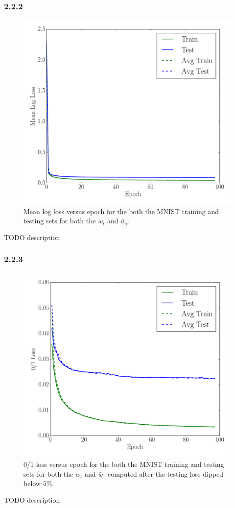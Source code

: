 \documentclass[12pt]{amsart}
\begin{document}
\subsubsection*{2.2.2}
\begin{figure}[H]
	\includegraphics[width=\columnwidth]{logistic_log_loss.pdf}
    \caption{Mean log loss versus epoch for the both the MNIST training and testing sets for both the $w_t$ and $\bar{w}_{\tau}$.}
    \label{fig:logistic_log_loss}
\end{figure}
TODO description

\subsubsection*{2.2.3}
\begin{figure}[H]
	\includegraphics[width=\columnwidth]{logistic_01_loss_masked.pdf}
    \caption{0/1 loss versus epoch for the both the MNIST training and testing sets for both the $w_t$ and $\bar{w}_{\tau}$ computed after the testing loss dipped below $5\%$.}
    \label{fig:logistic_01_loss_masked}
\end{figure}
TODO description
\end{document}
